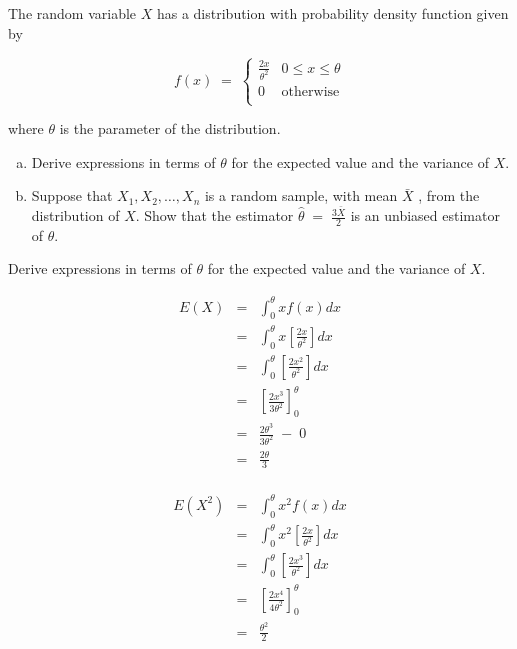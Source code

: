 \documentclass[a4paper,12pt]{article}
\begin{document}
\large
\noindent The random variable $X$ has a distribution with probability density function given by
{

\[  f(x) \;=\; \begin{cases} 
{\displaystyle \frac{2x}{\theta^2} }  & 0 \leq x \leq \theta \\
0  & \mbox{otherwise} \\
\end{cases}\]
}

where $\theta$ is the parameter of the distribution.
\begin{enumerate}[(a)]
\item 
Derive expressions in terms of $\theta$ for the expected value and the variance of $X$.\\
\medskip
\item 
Suppose that $X_1 , X_2 , \ldots , X_n$ is a random sample, with mean $\bar{X}$ , from the distribution
of $X$. Show that the estimator $ {  \displaystyle \hat{\theta}  \;=\; \frac{3\bar{X}}{2} }$ is an unbiased estimator of $\theta$.

\end{enumerate}

\newpage
\begin{framed} \large
\noindent Derive expressions in terms of $\theta$ for the expected value and the variance of $X$.
\end{framed}


\begin{eqnarray*}
E ( X ) &=& \int^{\theta}_{0} x f(x) dx \\
&=& \int^{\theta}_{0} x \left[ \frac{2x}{\theta^2} \right] dx\\
&=& \int^{\theta}_{0}  \left[ \frac{2x^2}{\theta^2} \right] dx\\
&=& \left[ \frac{2x^3}{3\theta^2} \right]^{\theta}_{0} \\
&=& \frac{2\theta^3}{3\theta^2} \;-\;0 \\
&=& \frac{2 \theta}{3} \\
\end{eqnarray*}


\begin{eqnarray*}
E ( X^2 ) &=& \int^{\theta}_{0} x^2 f(x) dx \\
&=& \int^{\theta}_{0} x^2 \left[ \frac{2x}{\theta^2} \right] dx\\
&=& \int^{\theta}_{0} \left[ \frac{2x^3}{\theta^2} \right] dx \\
&=& \left[ \frac{2x^4}{4\theta^2} \right]^{\theta}_{0} \\
&=& \frac{ \theta^2}{2} \\
\end{eqnarray*}
\newpage 
\end{document}
